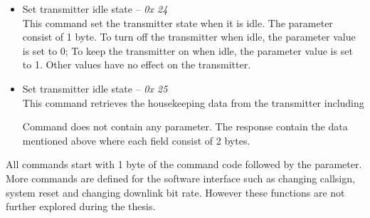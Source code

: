 \documentclass[a4paper]{article}
\begin{document}
\begin{itemize}
    \item Set transmitter idle state -- \textit{0x 24}\\
    This command set the transmitter state when it is idle. The parameter consist of 1 byte. To turn off the transmitter when idle, the parameter value is set to 0; To keep the transmitter on when idle, the parameter value is set to 1. Other values have no effect on the transmitter.
    
    \item Set transmitter idle state -- \textit{0x 25}\\
    This command retrieves the housekeeping data from the transmitter including 
     Command does not contain any parameter. The response contain the data mentioned above where each field consist of 2 bytes. 
\end{itemize}

All commands start with 1 byte of the command code followed by the parameter. More commands are defined for the software interface such as changing callsign, system reset and changing downlink bit rate. However these functions are not further explored during the thesis.






\newpage





\newpage
\end{document}
